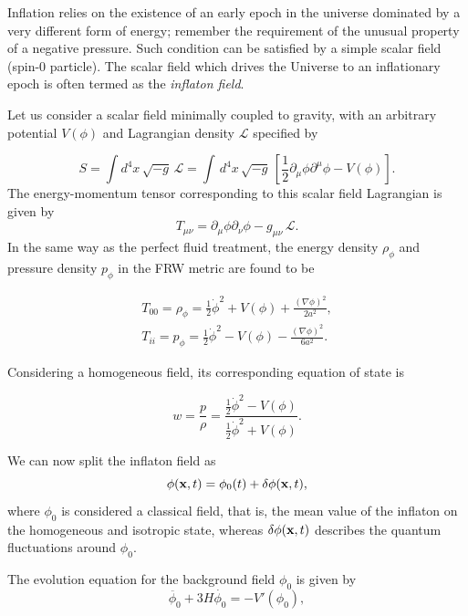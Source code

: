 \documentclass{rmaa}
\def\beq{\begin{equation}}
\def\eeq{\end{equation}}
\begin{document}
Inflation relies on the existence of an early epoch in the universe dominated by a very 
different form of energy; remember the requirement of the unusual property of a negative 
pressure. Such condition can be satisfied by a simple scalar field (spin-0 particle). 
The scalar field which drives the Universe to an inflationary epoch is often termed 
as the \textit{inflaton field}. 
%

Let us consider a scalar field minimally coupled to gravity, with an arbitrary
potential $V(\phi)$ and Lagrangian density $\mathcal{L}$ specified by 


\begin{equation}
S=\int d^4x\, \sqrt{-g}\,\mathcal{L}=\int\, d^4x\, \sqrt{-g}\,
\left[\frac{1}{2}
\partial_{\mu}\phi
\partial^{\mu}\phi -V(\phi)\right].
\end{equation}
%
%
The energy-momentum tensor corresponding to this scalar field Lagrangian is given by
\beq
T_{\mu\nu}=\partial_{\mu}\phi \partial_{\nu}\phi
-g_{\mu\nu}\, \mathcal{L}.
\eeq
%
In the same way as the perfect fluid treatment, the
energy density $\rho_\phi$ and pressure density $p_\phi$ in the FRW metric are found to be 

\begin{eqnarray}
T_{00}=\rho_{\phi}=\frac{1}{2}\dot{\phi}^2 + V(\phi)+ 
\frac{(\nabla \phi)^2}{2a^2},  \\
T_{ii}=p_{\phi}=\frac{1}{2}\dot{\phi}^2 - V(\phi)- \frac{(\nabla
\phi)^2}{6a^2}.
\end{eqnarray}

\noindent
Considering a homogeneous field, its corresponding equation of state is
 
\begin{equation}
w = \frac{p}{\rho}=\frac{\frac{1}{2}\dot \phi^2-V(\phi)}{\frac{1}{2}\dot \phi^2+V(\phi)}.
\end{equation}

\noindent
We can now split the inflaton field as
\beq \label{eq:split}
\phi({\bf x},t)=\phi_{0}(t)+\delta\phi({\bf x},t),
\eeq
where $\phi_{0}$ is considered a classical field, that is, 
the mean value of the inflaton on the homogeneous and isotropic state, 
whereas $\delta\phi({\bf x},t)$ describes the quantum fluctuations around $\phi_{0}$.

\noindent
The evolution equation for the background field $\phi_0$  is given by
\begin{equation}
\ddot{\phi_0}+ 3H\dot{\phi_0}= -V'(\phi_0),
\label{eq:motion1}
\end{equation}
\end{document}
